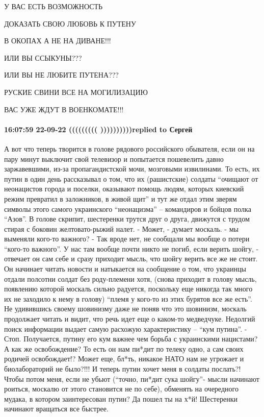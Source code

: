 У ВАС ЕСТЬ ВОЗМОЖНОСТЬ 


ДОКАЗАТЬ СВОЮ ЛЮБОВЬ К ПУТЕНУ


В ОКОПАХ А НЕ НА ДИВАНЕ!!!


ИЛИ ВЫ ССЫКУНЫ???


ИЛИ ВЫ НЕ ЛЮБИТЕ ПУТЕНА???


РУСКИЕ СВИНИ ВСЕ НА МОГИЛИЗАЦИЮ 


ВАС УЖЕ ЖДУТ В ВОЕНКОМАТЕ!!!


\paragraph{16:07:59 22-09-22 ((((((((( ))))))))))replied to Сергей}

А вот что теперь творится в голове рядового российского обывателя, если он на пару минут выключит свой телевизор и попытается пошевелить давно заржавевшими, из-за пропагандистской мочи, мозговыми извилинами.
То есть, их путин в один день рассказывал о том, что их (рашистские) солдаты “очищают от неонацистов города и поселки, оказывают помощь людям, которых киевский режим превратил в заложников, в живой щит” и тут же отдал этим зверям символы этого самого украинского “неонацизма” – командиров и бойцов полка “Азов”.
В голове скрипит, шестеренки трутся друг о друга, движутся с трудом стирая с боковин желтовато-рыжий налет.
- Может, - думает москаль. - мы выменяли кого-то важного?
- Так вроде нет, не сообщали мы вообще о потери “кого-то важного”. У нас там вообще почти никто не погиб, если верить шойгу, - отвечает он сам себе и сразу приходит мысль, что шойгу верить все же не стоит.
Он начинает читать новости и натыкается на сообщение о том, что украинцы отдали полсотни солдат без роду-племени хотя, (снова приходит в голову мысль, появлению которой москаль сильно радуется, поскольку еще никогда так много их не заходило к нему в голову) “племя у кого-то из этих бурятов все же есть”. Не удивившись своему шовинизму даже не поняв что это шовинизм, москаль продолжает читать и видит, что речь идет еще о каком-то медведчуке. Недолгий поиск информации выдает самую расхожую характеристику – “кум путина”.
- Стоп. Получается, путину его кум важнее чем борьба с украинскими нацистами? А как же освобождение? То есть он нам пи*дит по телеку одно, а сам своих родичей освобождает!? Может еще, бл*ть, никакое НАТО нам не угрожает и биолабораторий не было?!!! И теперь путин хочет меня в солдаты послать?! Чтобы потом меня, если не убьют (“точно, пи*дит сука шойгу”- мысли начинают роиться, москалю от этого становится не по себе), обменять на очередного мудака, в котором заинтересован путин? Да пошел ты на х*й!
Шестеренки начинают вращаться все быстрее.


